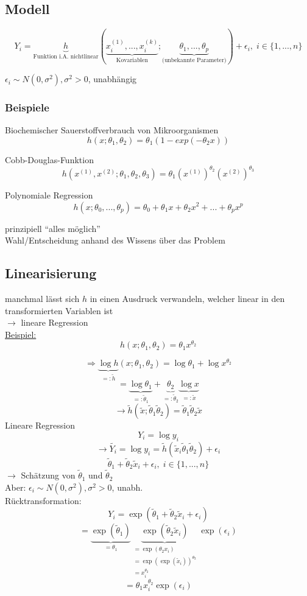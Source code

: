 \subsection{Modell}
\[Y_i = \underbrace{h}_{\text{Funktion i.A. nichtlinear}} \left(\underbrace{x_i^{(1)},...,x_i^{(k)}}_{\text{Kovariablen}};
\underbrace{\theta_1,...,\theta_p}_{\text{(unbekannte Parameter)}} \right) + \epsilon_i, \; i \in \{1,...,n\} \]

$\epsilon_i \sim N(0,\sigma^2) , \sigma^2 >0$, unabhängig

\subsubsection{Beispiele}
Biochemischer Sauerstoffverbrauch von Mikroorganismen
\[h(x;\theta_1,\theta_2) = \theta_1(1-exp(-\theta_2 x)) \]

Cobb-Douglas-Funktion
\[h(x^{(1)},x^{(2)}; \theta_1, \theta_2, \theta_3)= \theta_1(x^{(1)})^{\theta_2} (x^{(2)})^{\theta_3} \]

Polynomiale Regression
\[h(x; \theta_0,..., \theta_p)= \theta_0 + \theta_1 x  + \theta_2 x^2 + ... + \theta_p x^p \]

prinzipiell ``alles möglich'' \\

Wahl/Entscheidung anhand des Wissens über das Problem

\subsection{Linearisierung}
manchmal lässt sich $h$ in einen Ausdruck verwandeln, welcher linear in den transformierten Variablen ist \\
$\rightarrow$ lineare Regression \\
\underline{Beispiel:}
\[ h(x; \theta_1, \theta_2) = \theta_1 x^{\theta_2} \]

\[ \Rightarrow \underbrace{\log h}_{=:  \tilde{h}}(x; \theta_1, \theta_2) = \log \theta_1 + \log x^{\theta_2} \]
\[= \underbrace{\log \theta_1}_{=: \tilde{\theta}_1} + \underbrace{\theta_2}_{=: \tilde{\theta}_2} \underbrace{ \log x }_{=: \tilde{x}} \]
\[ \rightarrow \tilde{h}(\tilde{x};\tilde{\theta}_1 \tilde{\theta}_2 ) = \tilde{\theta}_1 \tilde{\theta}_2 \tilde{x} \]
Lineare Regression
\[ Y_i=\log y_i \]
\[ \rightarrow \tilde{Y_i} = \log y_i = \tilde{h}(\tilde{x}_i \tilde{\theta}_1 \tilde{\theta}_2) + \epsilon_i \]
\[ \tilde{\theta}_1 + \tilde{\theta}_2 \tilde{x}_i + \epsilon_i, \; i \in \{1,...,n\} \]
$\rightarrow$ Schätzung von $\tilde{\theta}_1$ und $\tilde{\theta}_2$ \\
Aber: $\epsilon_i \sim N(0,\sigma^2), \sigma^2 > 0$, unabh.\\
Rücktransformation:
\[ Y_i = \exp(\tilde{\theta}_1 + \tilde{\theta}_2 \tilde{x}_i + \epsilon_i ) \]
\[ = \underbrace{\exp(\tilde{\theta}_1)}_{=\theta_1} \underbrace{\exp(\tilde{\theta}_2\tilde{x}_i)}_{
	\substack{= \exp(\theta_2 x_i) \\ = \exp ( \exp ( \tilde{x}_i ))^{\theta_2} \\ = x_i^{\theta_2} }}
\exp(\epsilon_i) \]
\[= \theta_1 x_i^{\theta_2} \exp (\epsilon_i) \]


